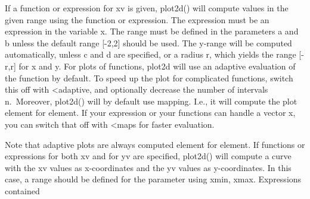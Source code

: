 \documentclass[
]{book}
\begin{document}
If a function or expression for xv is given, plot2d() will compute values in the given range using the function or expression. The expression must be an expression in the variable x. The range must be defined in the parameters a and b unless the default range {[}-2,2{]} should be used. The y-range will be computed automatically, unless c and d are specified, or a radius r, which yields the range {[}-r,r{]} for x and y. For plots of functions, plot2d will use an adaptive evaluation of the function by default. To speed up the plot for complicated functions, switch this off with \textless adaptive, and optionally decrease the number of intervals n.~Moreover, plot2d() will by default use mapping. I.e., it will compute the plot element for element. If your expression or your functions can handle a vector x, you can switch that off with \textless maps for faster evaluation.

Note that adaptive plots are always computed element for element. If functions or expressions for both xv and for yv are specified, plot2d() will compute a curve with the xv values as x-coordinates and the yv values as y-coordinates. In this case, a range should be defined for the parameter using xmin, xmax. Expressions contained

\backmatter
\end{document}
